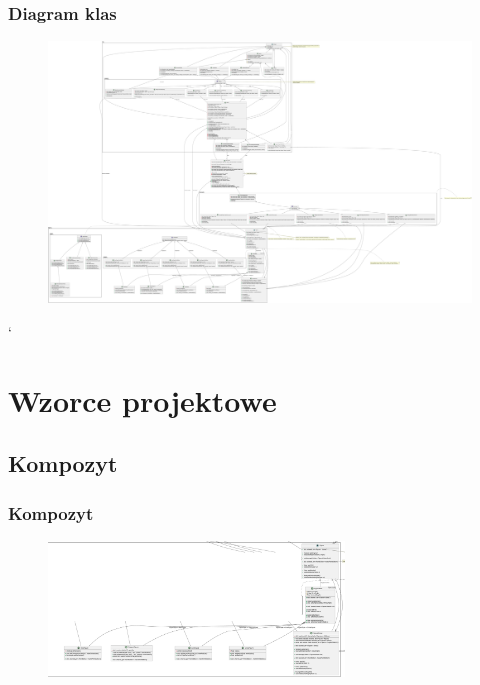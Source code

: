\documentclass[
	11pt,]{beamer}
\begin{document}
\begin{frame}
	\frametitle{Diagram klas}
	
	\begin{figure}
		\includegraphics[height=0.7\textheight]{figures/class_diagram.pdf}
	\end{figure}`
\end{frame}


\section{Wzorce projektowe}

\subsection{Kompozyt}

\begin{frame}
	\frametitle{Kompozyt}
	
	\begin{figure}
		\includegraphics[width=0.7\textwidth]{figures/kompozyt.pdf}
	\end{figure}
\end{frame}
\end{document}
